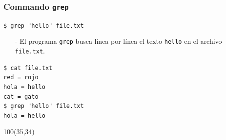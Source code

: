 \documentclass{beamer}
\begin{document}
\begin{frame}[fragile,t]
    \frametitle{Commando \texttt{grep}}
    \begin{block}{\vspace*{-3ex}}
    \texttt{\$}\verb: grep "hello" file.txt:
    \vspace*{0.5ex}
    \end{block}
    \begin{itemize}
    \item[-] El programa \verb|grep| busca línea por línea el texto \verb|hello| en el archivo \verb|file.txt|.
    \end{itemize}
    \vspace{1.8cm}
    \pause
    \begin{block}{\vspace*{-3ex}}
    \texttt{\$}\verb: cat file.txt:\\
    \verb;red = rojo;\\
    \verb;hola = hello;\\
    \verb;cat = gato;\\
    \vspace{0.2cm}
    \texttt{\$}\verb: grep "hello" file.txt:\\
    \verb;hola = hello;\\
    \vspace*{0.5ex}
    \end{block}
    \begin{textblock}{100}(35,34)
    \begin{center}
    \end{center}
    \end{textblock}
\end{frame}
\end{document}
